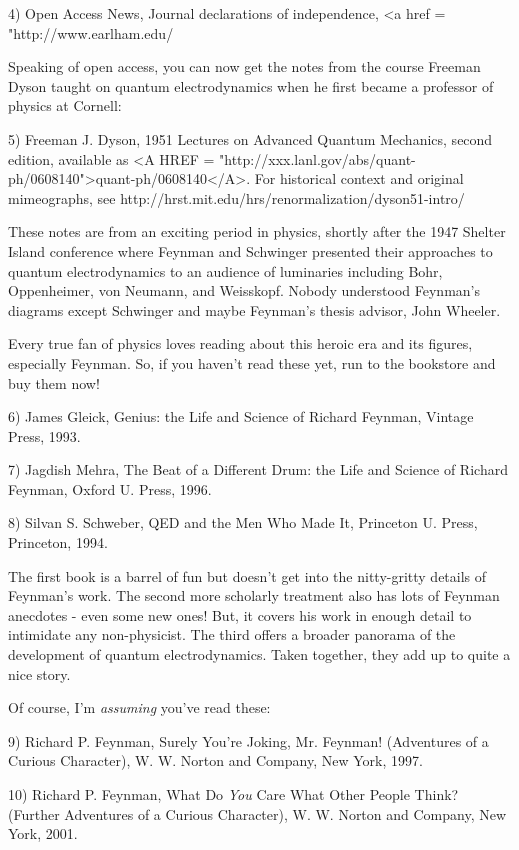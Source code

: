 4) Open Access News, Journal declarations of independence,
<a href = "http://www.earlham.edu/%

Speaking of open access, you can now get the notes from the course 
Freeman Dyson taught on quantum electrodynamics when he first
became a professor of physics at Cornell: 

5) Freeman J. Dyson, 1951 Lectures on Advanced Quantum Mechanics,
second edition, available as <A HREF = "http://xxx.lanl.gov/abs/quant-ph/0608140">quant-ph/0608140</A>.  For historical
context and original mimeographs, see 
http://hrst.mit.edu/hrs/renormalization/dyson51-intro/ 

These notes are from an exciting period in physics, shortly after
the 1947 Shelter Island conference where Feynman and Schwinger 
presented their approaches to quantum electrodynamics to an audience
of luminaries including Bohr, Oppenheimer, von Neumann, and Weisskopf.
Nobody understood Feynman's diagrams except Schwinger and maybe 
Feynman's thesis advisor, John Wheeler.

Every true fan of physics loves reading about this heroic era and 
its figures, especially Feynman.  So, if you haven't read these yet, 
run to the bookstore and buy them now!  

6) James Gleick, Genius: the Life and Science of Richard Feynman,
Vintage Press, 1993.

7) Jagdish Mehra, The Beat of a Different Drum: the Life and Science
of Richard Feynman, Oxford U. Press, 1996. 

8) Silvan S. Schweber, QED and the Men Who Made It, Princeton U.
Press, Princeton, 1994.

The first book is a barrel of fun but doesn't get into the nitty-gritty
details of Feynman's work.  The second more scholarly treatment also
has lots of Feynman anecdotes - even some new ones!  But, it covers
his work in enough detail to intimidate any non-physicist.  The third
offers a broader panorama of the development of quantum electrodynamics.
Taken together, they add up to quite a nice story. 

Of course, I'm \emph{assuming} you've read these: 

9) Richard P. Feynman, Surely You're Joking, Mr. Feynman! (Adventures
of a Curious Character), W. W. Norton and Company, New York, 1997.

10) Richard P. Feynman, What Do \emph{You} Care What Other People Think?
(Further Adventures of a Curious Character), W. W. Norton and Company, 
New York, 2001.

